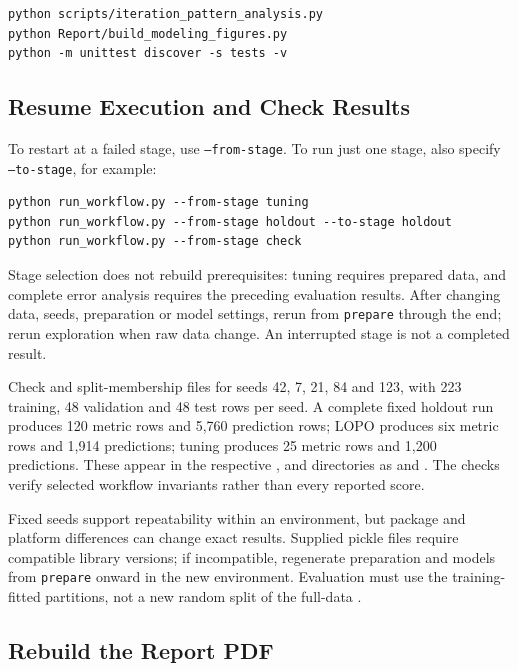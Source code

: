 \begin{verbatim}
python scripts/iteration_pattern_analysis.py
python Report/build_modeling_figures.py
python -m unittest discover -s tests -v
\end{verbatim}

\subsection{Resume Execution and Check Results}

To restart at a failed stage, use \texttt{--from-stage}. To run just one stage,
also specify \texttt{--to-stage}, for example:

\begin{verbatim}
python run_workflow.py --from-stage tuning
python run_workflow.py --from-stage holdout --to-stage holdout
python run_workflow.py --from-stage check
\end{verbatim}

Stage selection does not rebuild prerequisites: tuning requires prepared data,
and complete error analysis requires the preceding evaluation results. After
changing data, seeds, preparation or model settings, rerun from
\texttt{prepare} through the end; rerun exploration when raw data change.
An interrupted stage is not a completed result.

Check  and split-membership files for seeds
42, 7, 21, 84 and 123, with 223 training, 48 validation and 48 test rows per
seed. A complete fixed holdout run produces 120 metric rows and 5,760 prediction
rows; LOPO produces six metric rows and 1,914 predictions; tuning produces
25 metric rows and 1,200 predictions. These appear in the respective
,  and 
directories as  and .
The checks verify selected workflow invariants rather than every reported score.

Fixed seeds support repeatability within an environment, but package and
platform differences can change exact results. Supplied pickle files require
compatible library versions; if incompatible, regenerate preparation and
models from \texttt{prepare} onward in the new environment. Evaluation must
use the training-fitted partitions, not a new random split of the full-data
.

\subsection{Rebuild the Report PDF}

